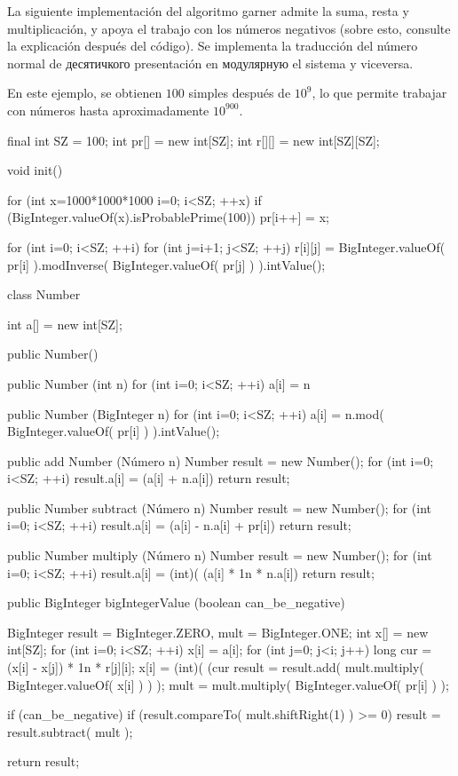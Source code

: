 La siguiente implementación del algoritmo garner admite la suma, resta y multiplicación, y apoya el trabajo con los números negativos (sobre esto, consulte la explicación después del código). Se implementa la traducción del número normal de десятичкого presentación en модулярную el sistema y viceversa.

En este ejemplo, se obtienen $100$ simples después de $10^9$, lo que permite trabajar con números hasta aproximadamente $10^{900}$.

\javacode
final int SZ = 100;
int pr[] = new int[SZ];
int r[][] = new int[SZ][SZ];

void init() {
for (int x=1000*1000*1000 i=0; i<SZ; ++x)
if (BigInteger.valueOf(x).isProbablePrime(100))
pr[i++] = x;

for (int i=0; i<SZ; ++i)
for (int j=i+1; j<SZ; ++j)
r[i][j] = BigInteger.valueOf( pr[i] ).modInverse(
BigInteger.valueOf( pr[j] ) ).intValue();
}


class Number {

int a[] = new int[SZ];

public Number() {
}

public Number (int n) {
for (int i=0; i<SZ; ++i)
a[i] = n %
}

public Number (BigInteger n) {
for (int i=0; i<SZ; ++i)
a[i] = n.mod( BigInteger.valueOf( pr[i] ) ).intValue();
}

public add Number (Número n) {
Number result = new Number();
for (int i=0; i<SZ; ++i)
result.a[i] = (a[i] + n.a[i]) %
return result;
}

public Number subtract (Número n) {
Number result = new Number();
for (int i=0; i<SZ; ++i)
result.a[i] = (a[i] - n.a[i] + pr[i]) %
return result;
}

public Number multiply (Número n) {
Number result = new Number();
for (int i=0; i<SZ; ++i)
result.a[i] = (int)( (a[i] * 1n * n.a[i]) %
return result;
}

public BigInteger bigIntegerValue (boolean can_be_negative) {
BigInteger result = BigInteger.ZERO,
mult = BigInteger.ONE;
int x[] = new int[SZ];
for (int i=0; i<SZ; ++i) {
x[i] = a[i];
for (int j=0; j<i; j++) {
long cur = (x[i] - x[j]) * 1n * r[j][i];
x[i] = (int)( (cur %
}
result = result.add( mult.multiply( BigInteger.valueOf( x[i] ) ) );
mult = mult.multiply( BigInteger.valueOf( pr[i] ) );
}

if (can_be_negative)
if (result.compareTo( mult.shiftRight(1) ) >= 0)
result = result.subtract( mult );

return result;
}
}
\endcode

